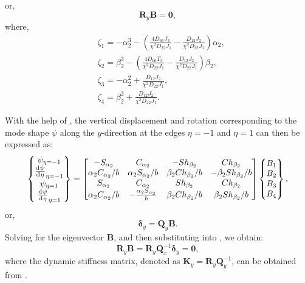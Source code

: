 \documentclass[preprint,12pt,number]{elsarticle}
\newcommand{\id}{\mathrm{d}\mkern1mu}
\begin{document}
%
or,
%
\begin{equation}\label{eq:ABy1}
\mathbf{R}_y \mathbf{B} = \mathbf{0},
\end{equation}
%
where,
%
\begin{equation}\label{eq:gammay}
\begin{split}
	&\zeta_1=-\alpha_2^3-\left( \frac{4D_{66}J_3}{\chi^2D_{22}J_1}  - \frac{D_{12}J_2}{\chi^2D_{22}J_1}  \right)\alpha_2,\\
	&\zeta_2=\beta_2^3-\left( \frac{4D_{66}T_3}{\chi^2D_{22}J_1}  - \frac{D_{12}J_2}{\chi^2D_{22}J_1}  \right)\beta_2,\\
	&\zeta_3=-\alpha_2^2+\frac{D_{12}J_2}{\chi^2D_{22}J_1},\\
	&\zeta_4=\beta_2^2+\frac{D_{12}J_2}{\chi^2D_{22}J_1}.
\end{split}
\end{equation}

With the help of , the vertical displacement and rotation corresponding to the mode shape $\psi$ along the $y$-direction at the edges $\eta = -1$ and $\eta = 1$ can then be expressed as:
%
\begin{equation}\label{eq:UBy}
\begin{split}
	\begin{Bmatrix}
		\psi_{\eta=-1}\\\frac{\id \psi}{\id \eta}_{\eta=-1}\\\psi_{\eta=1}\\\frac{\id \psi}{\id \eta}_{\eta=1}
	\end{Bmatrix}
	= \begin{bmatrix}
		-S_{\alpha_2} & C_{\alpha_2} & -Sh_{\beta_2} & Ch_{\beta_2} \\
		\alpha_2 C_{\alpha_2}/b & \alpha_2 S_{\alpha_2}/b & \beta_2 Ch_{\beta_2}/b & -\beta_2 Sh_{\beta_2}/b \\
		S_{\alpha_2} & C_{\alpha_2} & Sh_{\beta_2} & Ch_{\beta_2} \\
		\alpha_2 C_{\alpha_2}/b & -\frac{\alpha_2 S_{\alpha_2}}{b} & \beta_2 Ch_{\beta_2}/b & \beta_2 Sh_{\beta_2}/b
	\end{bmatrix}
	\begin{Bmatrix}
		B_1\\B_2\\B_3\\B_4
	\end{Bmatrix},		
\end{split}
\end{equation}
%
or,
%
\begin{equation}\label{eq:UBy1}
\mathbf{\delta}_y= \mathbf{Q}_y\mathbf{B}.
\end{equation}
%
Solving for the eigenvector $\mathbf{B}$, and then substituting into , we obtain:
%
\begin{equation}\label{eq:DSM_eqy}
\mathbf{R}_y\mathbf{B}=\mathbf{R}_y \mathbf{Q}_x^{-1} 
\mathbf{\delta}_y = \mathbf{0},
\end{equation}
%
where the dynamic stiffness matrix, denoted as $\mathbf{K}_y = \mathbf{R}_y \mathbf{Q}_y^{-1}$, can be obtained from .
\end{document}
